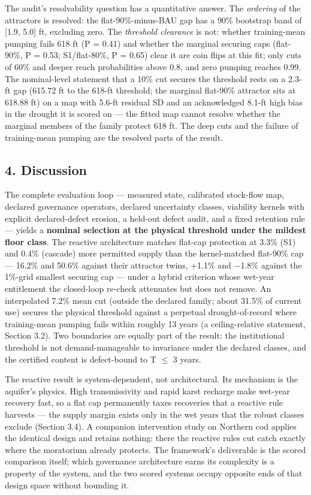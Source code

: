 \documentclass[11pt]{article}
\begin{document}
The audit's resolvability question has a quantitative answer. The
\emph{ordering} of the attractors is resolved: the flat-90\%-minus-BAU
gap has a 90\% bootstrap band of {[}1.9, 5.0{]} ft, excluding zero. The
\emph{threshold clearance} is not: whether training-mean pumping fails
618 ft (P = 0.41) and whether the marginal securing caps (flat-90\%, P =
0.53; S1/flat-80\%, P = 0.65) clear it are coin flips at this fit; only
cuts of 60\% and deeper reach probabilities above 0.8, and zero pumping
reaches 0.99. The nominal-level statement that a 10\% cut secures the
threshold rests on a 2.3-ft gap (615.72 ft to the 618-ft threshold; the
marginal flat-90\% attractor sits at 618.88 ft) on a map with 5.6-ft
residual SD and an acknowledged 8.1-ft high bias in the drought it is
scored on --- the fitted map cannot resolve whether the marginal members
of the family protect 618 ft. The deep cuts and the failure of
training-mean pumping are the resolved parts of the result.

\subsection{4. Discussion}\label{discussion}

The complete evaluation loop --- measured state, calibrated stock-flow
map, declared governance operators, declared uncertainty classes,
viability kernels with explicit declared-defect erosion, a held-out
defect audit, and a fixed retention rule --- yields a \textbf{nominal
selection at the physical threshold under the mildest floor class}. The
reactive architecture matches flat-cap protection at 3.3\% (S1) and
0.4\% (cascade) more permitted supply than the kernel-matched flat-90\%
cap --- 16.2\% and 50.6\% against their attractor twins, +1.1\% and
\ensuremath{-}1.8\% against the 1\%-grid smallest securing cap --- under a hybrid
criterion whose wet-year entitlement the closed-loop re-check attenuates
but does not remove. An interpolated 7.2\% mean cut (outside the
declared family; about 31.5\% of current use) secures the physical
threshold against a perpetual drought-of-record where training-mean
pumping fails within roughly 13 years (a ceiling-relative statement,
Section 3.2). Two boundaries are equally part of the result: the
institutional threshold is not demand-manageable to invariance under the
declared classes, and the certified content is defect-bound to T \ensuremath{\leq} 3
years.

The reactive result is system-dependent, not architectural. Its
mechanism is the aquifer's physics. High transmissivity and rapid karst
recharge make wet-year recovery fast, so a flat cap permanently taxes
recoveries that a reactive rule harvests --- the supply margin exists
only in the wet years that the robust classes exclude (Section 3.4). A
companion intervention study on Northern cod applies the identical
design and retains nothing: there the reactive rules cut catch exactly
where the moratorium already protects. The framework's deliverable is
the scored comparison itself; which governance architecture earns its
complexity is a property of the system, and the two scored systems
occupy opposite ends of that design space without bounding it.
\end{document}
